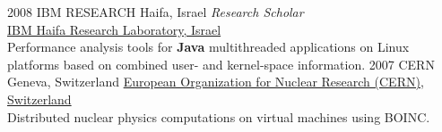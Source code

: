 \documentclass[]{friggeri-cv} %
\begin{document}
\begin{entrylist}
\entry
{2008}
{IBM RESEARCH}
{Haifa, Israel}
{\emph{Research Scholar} \\
{\href{http://www.haifa.il.ibm.com/}{IBM Haifa Research Laboratory, Israel}}{}{} \\
Performance analysis tools for \textbf{Java} multithreaded applications on Linux platforms based on
combined user- and kernel-space information.}
\vspace{0.3em}
\entry
{2007}
{CERN}
{Geneva, Switzerland}
{%
{\href{http://public.web.cern.ch/public/Welcome.html}{European Organization for Nuclear Research (CERN), Switzerland}}{}{} \\
Distributed nuclear physics computations on virtual machines using BOINC.}
\end{entrylist}






\end{document}
